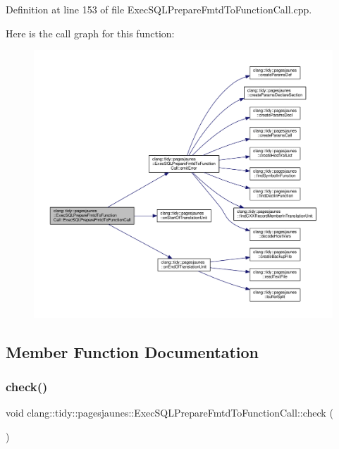 Definition at line 153 of file Exec\+S\+Q\+L\+Prepare\+Fmtd\+To\+Function\+Call.\+cpp.

Here is the call graph for this function\+:
\nopagebreak
\begin{figure}[H]
\begin{center}
\leavevmode
\includegraphics[width=350pt]{classclang_1_1tidy_1_1pagesjaunes_1_1_exec_s_q_l_prepare_fmtd_to_function_call_ab8711ab57fe8dab91a56a31d01da3631_cgraph}
\end{center}
\end{figure}


\subsection{Member Function Documentation}
\mbox{\label{classclang_1_1tidy_1_1pagesjaunes_1_1_exec_s_q_l_prepare_fmtd_to_function_call_a2110f550c514850972d8fe7a57c9d754}} 
\subsubsection{\texorpdfstring{check()}{check()}}
{\footnotesize\ttfamily void clang\+::tidy\+::pagesjaunes\+::\+Exec\+S\+Q\+L\+Prepare\+Fmtd\+To\+Function\+Call\+::check (\begin{DoxyParamCaption}\item[{const ast\+\_\+matchers\+::\+Match\+Finder\+::\+Match\+Result \&}]{ }\end{DoxyParamCaption})\hspace{0.3cm}{\ttfamily [override]}}



